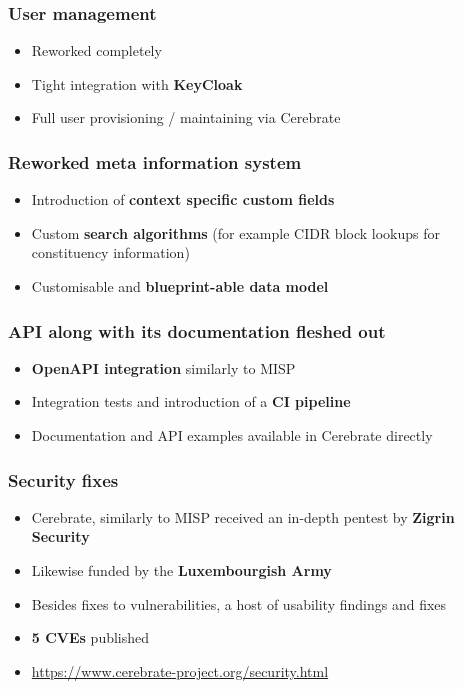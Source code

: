 \begin{frame}
  \frametitle{User management}
  \begin{itemize}
     \item Reworked completely
     \item Tight integration with {\bf KeyCloak}
     \item Full user provisioning / maintaining via Cerebrate
  \end{itemize}
\end{frame}

\begin{frame}
  \frametitle{Reworked meta information system}
  \begin{itemize}
     \item Introduction of {\bf context specific custom fields}
     \item Custom {\bf search algorithms} (for example CIDR block lookups for constituency information)
     \item Customisable and {\bf blueprint-able data model}
  \end{itemize}
\end{frame}

\begin{frame}
  \frametitle{API along with its documentation fleshed out}
  \begin{itemize}
     \item {\bf OpenAPI integration} similarly to MISP
     \item Integration tests and introduction of a {\bf CI pipeline}
     \item Documentation and API examples available in Cerebrate directly
  \end{itemize}
\end{frame}

\begin{frame}
  \frametitle{Security fixes}
  \begin{itemize}
     \item Cerebrate, similarly to MISP received an in-depth pentest by {\bf Zigrin Security}
     \item Likewise funded by the {\bf Luxembourgish Army}
     \item Besides fixes to vulnerabilities, a host of usability findings and fixes
     \item {\bf 5 CVEs} published
     \item \url{https://www.cerebrate-project.org/security.html}
  \end{itemize}
\end{frame}

